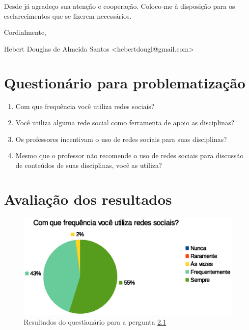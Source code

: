 \begin{apendicesenv}
Desde já agradeço sua atenção e cooperação. Coloco-me à disposição para os esclarecimentos que se fizerem necessários.

Cordialmente,
\begin{description}
\item Hebert Douglas de Almeida Santos <hebertdougl@gmail.com>
\end{description}

\chapter{Questionário para problematização}
\label{apen-quest}

\begin{enumerate}

\item \label{pergunta1} Com que frequência você utiliza redes sociais?

\item \label{pergunta2} Você utiliza alguma rede social como ferramenta de apoio as disciplinas?

\item \label{pergunta3} Os professores incentivam o uso de redes sociais para suas disciplinas?

\item \label{pergunta4} Mesmo que o professor não recomende o uso de redes sociais para discussão de conteúdos de suas disciplinas, você as utiliza?

\end{enumerate}


\chapter{Avaliação dos resultados}
\label{apen-quest-result}

\begin{figure}[h]
    \centering
    \includegraphics[keepaspectratio=true,scale=0.55]
      {figuras/pergunta1p.eps}
    \caption{Resultados do questionário para a pergunta \ref{pergunta1}}
    \label{pergunta1}
\end{figure}


\end{apendicesenv}
